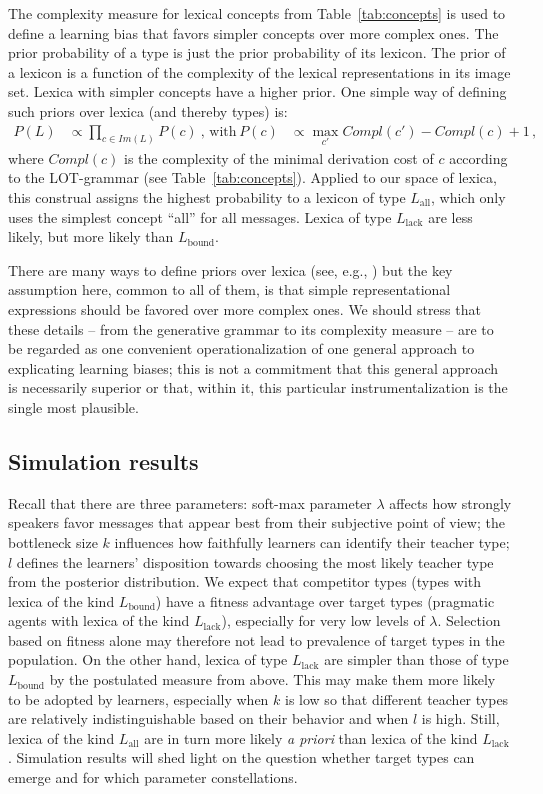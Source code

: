 \documentclass[a4paper, 11pt]{article}
\theoremstyle{Satz}
\newcommand{\mylang}[1]{\ensuremath{L_{\text{#1}}}\xspace} %
\newcommand{\Lall}{\mylang{all}}
\newcommand{\Lbound}{\mylang{bound}}
\newcommand{\Llack}{\mylang{lack}}
\begin{document}
The complexity measure for lexical concepts from Table~\ref{tab:concepts} is used to define a
learning bias that favors simpler concepts over more complex ones. The prior probability of a
type is just the prior probability of its lexicon. The prior of a lexicon is a function of the
complexity of the lexical representations in its image set. Lexica with simpler concepts have a
higher prior. One simple way of defining such priors over lexica (and thereby types) is:
\begin{align*}
  P(L)  & \propto \prod_{c \in Im(L)} P(c)   \ \text{, with} & 
  P(c) & \propto \max_{c'}Compl(c') - Compl(c) + 1\,,
\end{align*}
where $Compl(c)$ is the complexity of the minimal derivation cost of $c$ according to the
LOT-grammar (see Table~\ref{tab:concepts}). Applied to our space of lexica, this construal assigns the highest probability 
to a lexicon of type $\Lall$, which only uses the simplest concept ``all'' for
all messages. Lexica of type $\Llack$ are less likely, but more likely than $\Lbound$. 

There are many ways to define priors over lexica (see, e.g., \citealt{goodman+etal:2008,
  piantadosi+etal:2012a}) but the key assumption here, common to all of them, is that simple
representational expressions should be favored over more complex ones. We should stress that
these details -- from the generative grammar to its complexity measure -- are to be regarded as
one convenient operationalization of one general approach to explicating learning biases; this
is not a commitment that this general approach is necessarily superior or that, within it, this
particular instrumentalization is the single most plausible.


\subsection{Simulation results}
\label{sec:simulation-results}

Recall that there are three parameters: soft-max parameter $\lambda$ affects how strongly
speakers favor messages that appear best from their subjective point of view; the
bottleneck size $k$ influences how faithfully learners can identify their teacher type; $l$
defines the learners' disposition towards choosing the most likely teacher type from the
posterior distribution. We expect that competitor types (types with lexica of the kind
$\Lbound$) have a fitness advantage over target types (pragmatic agents with lexica of the kind
$\Llack$), especially for very low levels of $\lambda$. Selection based on fitness alone may
therefore not lead to prevalence of target types in the population. On the other hand, lexica
of type $\Llack$ are simpler than those of type $\Lbound$ by the postulated measure from
above. This may make them more likely to be adopted by learners, especially when $k$ is low so
that different teacher types are relatively indistinguishable based on their behavior and when
$l$ is high. Still, lexica of the kind $\Lall$ are in turn more likely \emph{a priori} than
lexica of the kind $\Llack$. Simulation results will shed light on the question whether target
types can emerge and for which parameter constellations.
\end{document}
